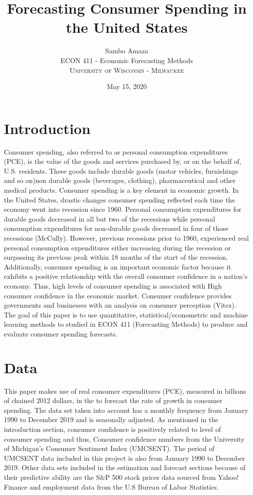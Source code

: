 \documentclass[12pt]{article}
\title{Forecasting Consumer Spending in the United States} %
\author{Sambo Amaza\\ %
ECON 411 - Economic Forecasting Methods\\ %
\textsc{University of Wisconsin - Milwaukee}
}
\date{May 15, 2020} %
\newcommand{\newpar}{\vspace{0.15in} \noindent}
\begin{document}
\setlength{\droptitle}{-5em}    
\maketitle
\section{Introduction}
Consumer spending, also referred to as  personal consumption expenditures (PCE), is the value of the goods and services purchased by, or on the behalf of, U.S. residents. These goods include durable goods (motor vehicles, furnishings and so  on)non durable goods (beverages, clothing), pharmaceutical and other medical products. 
\newpar
\newline
Consumer spending is a key element in economic growth. In the United States, drastic changes consumer spending reflected each time the economy went into recession since 1960. Personal consumption expenditures for durable goods decreased in
all but two of the recessions while personal consumption expenditures for non-durable goods decreased in four of those recessions (McCully). However, previous recessions prior to 1960, experienced real personal consumption expenditures either increasing during the recession or surpassing its previous peak within 18 months of the start of the recession. 
\newpar
\newline
Additionally, consumer spending is an important economic factor because it exhibits a positive relationship with the overall consumer confidence in a nation’s economy. Thus, high levels of  consumer spending is associated with High consumer confidence in the economic market. Consumer confidence provides governments and businesses with an analysis on consumer perception (Vitez). 
\newpar
\newline
The goal of this paper is to use quantitative, statistical/econometric and machine learning methods to studied in ECON 411 (Forecasting Methods) to produce and evaluate consumer spending forecasts.

\section{Data}
This paper makes use of real consumer expenditures (PCE), measured in billions of chained 2012 dollars, in the to forecast the rate of growth in consumer spending. The data set taken into account has a monthly frequency from January 1990 to December 2019 and is seasonally adjusted. As mentioned in the introduction section, consumer confidence is positively related to level of consumer spending and thus, Consumer confidence numbers  from the University of Michigan’s Consumer Sentiment Index (UMCSENT). The period of UMCSENT data included in this project is also from January 1990 to December 2019.
Other data sets included in the estimation and forecast sections because of their predictive ability are the S&P 500 stock prices data sourced from Yahoo! Finance and employment data from the U.S Bureau of Labor Statistics. 
\end{document}
